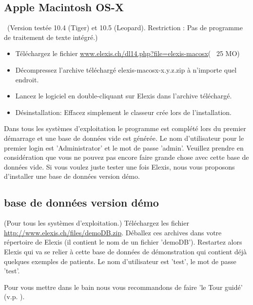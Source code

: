 \subsection{Apple Macintosh OS-X}\
(Version testée 10.4 (Tiger) et 10.5 (Leopard). Restriction : Pas de programme de traitement de texte intégré.)
\index{Macintosh}\index{Apple}
\begin{itemize}
	\item Téléchargez le fichier \href{http://www.elexis.ch/dl14.php?file=elexis-macosx}{www.elexis.ch/dl14.php?file=elexis-macosx}(~ 25 MO)
	\item Décompressez l'archive téléchargé elexis-macosx-x.y.z.zip à n'importe quel endroit.
    \item Lancez le logiciel en double-cliquant sur \glqq Elexis\grqq{} dans l'archive téléchargé.
	\item Désinstallation: Effacez simplement le classeur crée lors de l'installation.
\end{itemize}

Dans tous les systèmes d'exploitation le programme est complété lors du premier démarrage et une base de données vide est générée. Le nom d'utilisateur pour le premier login est 'Administrator' et le mot de passe 'admin'. Veuillez prendre en considération que vous ne pouvez pas encore faire grande chose avec cette base de données vide. Si vous voulez juste tester une fois Elexis, nous vous proposons d'installer une base de données version démo.

\subsection{base de données version démo}
(Pour tous les systèmes d'exploitation.) Téléchargez les fichier \href{http://www.elexis.ch/files/demoDB.zip}{http://www.elexis.ch/files/demoDB.zip}. Déballez ces archives dans votre répertoire de Elexis (il contient le nom de un fichier 'demoDB'). Restartez alors Elexis qui va se relier à cette base de données de démonstration qui contient déjà quelques exemples de patients. Le nom d'utilisateur est 'test', le mot de passe 'test'.

Pour vous mettre  \glqq dans le bain\grqq{} nous vous recommandons de faire 'le Tour guidé' (v.p.
\pageref{tour}).

